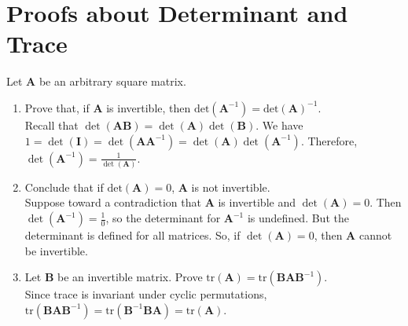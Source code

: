 \documentclass{article}
\begin{document}
\section{Proofs about Determinant and Trace}
\noindent Let $\mathbf{A}$ be an arbitrary square matrix.
\begin{enumerate}
\item Prove that, if $\mathbf{A}$ is invertible, then $\text{det}(\mathbf{A}^{-1}) = \text{det}(\mathbf{A})^{-1}$. \\
{\color{blue} Recall that $\det(\mathbf{AB}) = \det(\mathbf{A})\det(\mathbf{B})$. We have $1 = \det(\mathbf{I}) = \det(\mathbf{AA}^{-1}) = \det(\mathbf{A})\det(\mathbf{A}^{-1})$. Therefore, $\det(\mathbf{A}^{-1}) = \frac{1}{\det(\mathbf{A})}$.}
\item Conclude that if $\text{det}(\mathbf{A}) = 0$, $\mathbf{A}$ is not invertible. \\
{\color{blue} Suppose toward a contradiction that $\mathbf{A}$ is invertible and $\det(\mathbf{A}) = 0$. Then $\det(\mathbf{A}^{-1}) = \frac{1}{0}$, so the determinant for $\mathbf{A}^{-1}$ is undefined. But the determinant is defined for all matrices. So, if $\det(\mathbf{A}) = 0$, then $\mathbf{A}$ cannot be invertible.}
\item Let $\mathbf{B}$ be an invertible matrix. Prove $\text{tr}(\mathbf{A}) = \text{tr}(\mathbf{BAB}^{-1})$. \\
{\color{blue} Since trace is invariant under cyclic permutations, $\text{tr}(\mathbf{BAB}^{-1}) = \text{tr}(\mathbf{B}^{-1}\mathbf{BA}) = \text{tr}(\mathbf{A})$.}
\end{enumerate}
\end{document}
